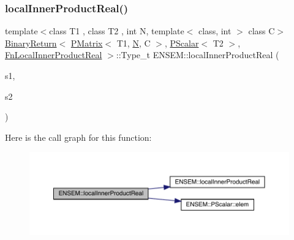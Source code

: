 \subsubsection{\texorpdfstring{localInnerProductReal()}{localInnerProductReal()}\hspace{0.1cm}{\footnotesize\ttfamily [2/3]}}
{\footnotesize\ttfamily template$<$class T1 , class T2 , int N, template$<$ class, int $>$ class C$>$ \\
\mbox{\hyperlink{structENSEM_1_1BinaryReturn}{Binary\+Return}}$<$ \mbox{\hyperlink{classENSEM_1_1PMatrix}{P\+Matrix}}$<$ T1, \mbox{\hyperlink{adat__devel_2lib_2hadron_2operator__name__util_8cc_a7722c8ecbb62d99aee7ce68b1752f337}{N}}, C $>$, \mbox{\hyperlink{classENSEM_1_1PScalar}{P\+Scalar}}$<$ T2 $>$, \mbox{\hyperlink{structENSEM_1_1FnLocalInnerProductReal}{Fn\+Local\+Inner\+Product\+Real}} $>$\+::Type\+\_\+t E\+N\+S\+E\+M\+::local\+Inner\+Product\+Real (\begin{DoxyParamCaption}\item[{const \mbox{\hyperlink{classENSEM_1_1PMatrix}{P\+Matrix}}$<$ T1, \mbox{\hyperlink{adat__devel_2lib_2hadron_2operator__name__util_8cc_a7722c8ecbb62d99aee7ce68b1752f337}{N}}, C $>$ \&}]{s1,  }\item[{const \mbox{\hyperlink{classENSEM_1_1PScalar}{P\+Scalar}}$<$ T2 $>$ \&}]{s2 }\end{DoxyParamCaption})\hspace{0.3cm}{\ttfamily [inline]}}

Here is the call graph for this function\+:\nopagebreak
\begin{figure}[H]
\begin{center}
\leavevmode
\includegraphics[width=350pt]{df/d0a/group__primmatrix_ga9db3f5557c105ded2a1e426229646f23_cgraph}
\end{center}
\end{figure}
\mbox{\label{group__primmatrix_ga8a2b85a888121b8b0ff46870c7705474}} 
